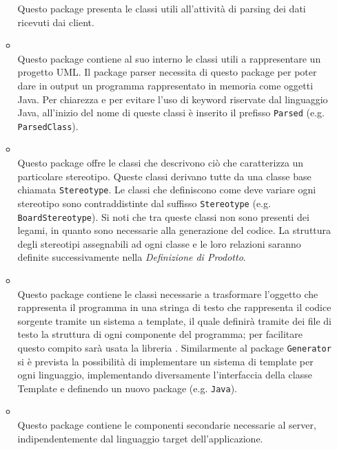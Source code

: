 \begin{itemize}
\begin{itemize}
Questo package presenta le classi utili all'attività di parsing dei dati ricevuti dai client.
\item \hyperref[\nogloxy{swedesigner::server::project}]{}\\
Questo package contiene al suo interno le classi utili a rappresentare un progetto UML. Il package parser necessita di questo package per poter dare in output un programma rappresentato in memoria come oggetti Java. Per chiarezza e per evitare l'uso di keyword riservate dal linguaggio Java, all'inizio del nome di queste classi è inserito il prefisso \texttt{Parsed} (e.g. \texttt{ParsedClass}).
\item \hyperref[\nogloxy{swedesigner::server::stereotype}]{}\\
Questo package offre le classi che descrivono ciò che caratterizza un particolare stereotipo. Queste classi derivano tutte da una classe base chiamata \texttt{Stereotype}. Le classi che definiscono come deve variare ogni stereotipo sono contraddistinte dal suffisso \texttt{Stereotype} (e.g. \texttt{BoardStereotype}). Si noti che tra queste classi non sono presenti dei legami, in quanto sono necessarie alla generazione del codice. La struttura degli stereotipi assegnabili ad ogni classe e le loro relazioni saranno definite successivamente nella \emph{Definizione di Prodotto}.
\item \hyperref[\nogloxy{swedesigner::server::template}]{}\\
Questo package contiene le classi necessarie a trasformare l'oggetto che rappresenta il programma in una stringa di testo che rappresenta il codice sorgente tramite un sistema a template, il quale definirà tramite dei file di testo la struttura di ogni componente del programma; per facilitare questo compito sarà usata la libreria \stringtemplate{}. Similarmente al package \texttt{Generator} si è prevista la possibilità di implementare un sistema di template per ogni linguaggio, implementando diversamente l'interfaccia della classe Template e definendo un nuovo package (e.g. \texttt{Java}).
\item \hyperref[\nogloxy{swedesigner::server::utility}]{}\\
Questo package contiene le componenti secondarie necessarie al server, indipendentemente dal linguaggio target dell'applicazione.
\end{itemize}
\end{itemize}
